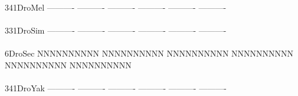 \documentclass[11pt,twoside,reqno,a4paper]{article}
\begin{document}
{\\
341\hspace*{1\charwidth}DroMel	----------	----------	----------	----------	----------	----------	\\
\hspace*{4\charwidth}\hspace*{7\charwidth}\hspace*{1\charwidth}\hspace*{1\charwidth}\hspace*{1\charwidth}\hspace*{1\charwidth}\hspace*{1\charwidth}\hspace*{1\charwidth}\\
331\hspace*{1\charwidth}DroSim	----------	----------	----------	----------	----------	----------	\\
\hspace*{4\charwidth}\hspace*{7\charwidth}\hspace*{1\charwidth}\hspace*{1\charwidth}\hspace*{1\charwidth}\hspace*{1\charwidth}\hspace*{1\charwidth}\hspace*{1\charwidth}\\
6\hspace*{3\charwidth}DroSec	NNNNNNNNNN	NNNNNNNNNN	NNNNNNNNNN	NNNNNNNNNN	NNNNNNNNNN	NNNNNNNNNN	\\
\hspace*{4\charwidth}\hspace*{7\charwidth}\hspace*{1\charwidth}\hspace*{1\charwidth}\hspace*{1\charwidth}\hspace*{1\charwidth}\hspace*{1\charwidth}\hspace*{1\charwidth}\\
341\hspace*{1\charwidth}DroYak	----------	----------	----------	----------	----------	----------	\\
\hspace*{4\charwidth}\hspace*{7\charwidth}\hspace*{1\charwidth}\hspace*{1\charwidth}\hspace*{1\charwidth}\hspace*{1\charwidth}\hspace*{1\charwidth}\hspace*{1\charwidth}\\
}
\end{document}
